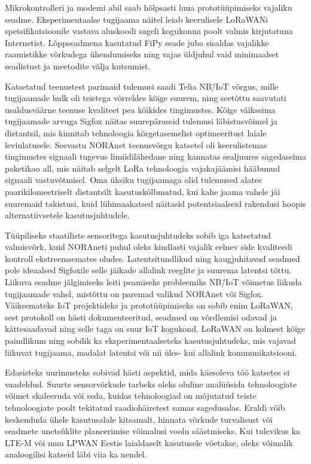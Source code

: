 \documentclass[12pt]{article}
\begin{document}
    Mikrokontrolleri ja modemi abil saab hõlpsasti luua prototüüpimiseks vajaliku seadme.
    Eksperimentaalse tugijaama näitel leiab keerulisele LoRaWANi spetsifikatsioonile vastava aluskoodi sageli kogukonna poolt valmis kirjutatuna Internetist.
    Lõppseadmena kasutatud FiPy seade juba sisaldas vajalikke raamistikke võrkudega ühendumiseks ning vajas üldjuhul vaid minimaalset seadistust ja meetodite välja kutsumist.

    Katsetatud teenustest parimaid tulemusi saadi Telia NB\=/IoT võrgus, mille tugijaamade hulk oli teistega võrreldes kõige suurem, ning seetõttu saavutati usaldusväärne teenuse kvaliteet pea kõikides tingimustes.
    Kõige väikseima tugijaamade arvuga Sigfox näitas suurepäraseid tulemusi läbistusvõimel ja distantsil, mis kinnitab tehnoloogia kõrgetasemelist optimeeritust laiale leviulatusele.
    Seevastu NORAnet teenusvõrgu katsetel oli keerulistemas tingimustes signaali tugevus limiidilähedane ning kannatas sealjuures sagedaseima paketikao all, mis näitab selgelt LoRa tehnoloogia vajakajäämisi hääbunud signaali vastuvõtmisel.
    Oma üksiku tugijaamaga olid tulemused alates paarikilomeetriselt distantsilt kasutuskõlbmatud, kui kahe jaama vahele jäi suuremaid takistusi, kuid lühimaakatsed näitasid potentsiaalseid rakendusi hoopis alternatiivsetele kasutusjuhtudele.

    Tüüpiliseks staatiliste sensoritega kasutusjuhtudeks sobib iga katsetatud valmisvõrk, kuid NORAneti puhul oleks kindlasti vajalik eelnev side kvaliteedi kontroll ekstreemsemates oludes.
    Latentsitundlikud ning kaugjuhitavad seadmed pole ideaalsed Sigfoxile selle jäikade allalink reeglite ja suurema latentsi tõttu.
    Liikuva seadme jälgimiseks leiti peamiseks probleemiks NB\=/IoT võimetus liikuda tugijaamade vahel, mistõttu on paremad valikud NORAnet või Sigfox.
    Väiksemateks IoT projektideks ja prototüüpimiseks on sobib enim LoRaWAN, sest protokoll on hästi dokumenteeritud, seadmed on võrdlemisi odavad ja kättesaadavad ning selle taga on suur IoT kogukond.
    LoRaWAN on kolmest kõige paindlikum ning sobilik ka eksperimentaalseteks kasutusjuhtudeks, mis vajavad liikuvat tugijaama, madalat latentsi või nii üles- kui allalink kommunikatsiooni.

    Edasisteks uurimusteks sobivad hästi aspektid, mida käesoleva töö katsetes ei vaadeldud.
    Suurte sensorvõrkude tarbeks oleks oluline analüüsida tehnoloogiate võimet skaleeruda või seda, kuidas tehnoloogiad on mõjutatud teiste tehnoloogiate poolt tekitatud raadiohäiretest samas sagedusalas.
    Eraldi võib keskenduda ühele kasutusalale kitsamalt, hinnata võrkude turvalisust või seadmete unetsüklite planeerimise võimalusi voolu säästmiseks.
    Kui tulevikus ka LTE-M või muu LPWAN Eestis laialdaselt kasutusele võetakse, oleks võimalik analoogilisi katseid läbi viia ka nendel.
\end{document}
